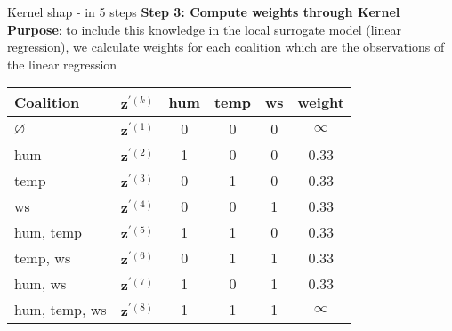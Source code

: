\documentclass[11pt,compress,t,notes=noshow, aspectratio=169, xcolor=table]{beamer}
\begin{document}
\begin{frame}{Kernel shap - in 5 steps}
\textbf{Step 3: Compute weights through Kernel}\\\medskip
\textbf{Purpose}: to include this knowledge in the local surrogate model (linear regression), we calculate weights for each coalition which are the observations of the linear regression

\begin{table}[]
    \centering
        \begin{tabular}{l |c|ccc|c}
 Coalition & $\mathbf{z}^{\prime (k)}$ &  hum & temp & ws & weight\\
  \hline 
  $\varnothing$ & $\mathbf{z}^{\prime (1)}$ & 0 & 0 & 0 & $\infty$ \\
  hum & $\mathbf{z}^{\prime (2)}$ & 1 & 0 & 0 & 0.33 \\
  temp &  $\mathbf{z}^{\prime (3)}$ & 0 & 1 & 0 & 0.33 \\
  ws &   $\mathbf{z}^{\prime (4)}$ & 0 & 0 & 1 & 0.33  \\
  hum, temp & $\mathbf{z}^{\prime (5)}$ & 1 & 1 & 0 & 0.33 \\
  temp, ws & $\mathbf{z}^{\prime (6)}$ & 0 & 1 & 1 & 0.33 \\
  hum, ws &   $\mathbf{z}^{\prime (7)}$ & 1 & 0 & 1 & 0.33 \\
  hum, temp, ws & $\mathbf{z}^{\prime (8)}$ & 1 & 1 & 1 & $\infty$ \\
  
 
  \end{tabular}
\end{table}
\medskip
{}

  
\end{frame}
\end{document}
